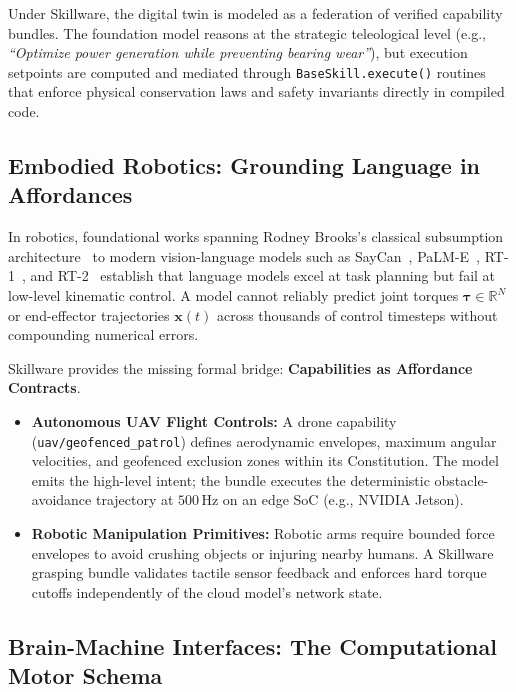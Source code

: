 Under Skillware, the digital twin is modeled as a federation of verified capability bundles. The foundation model reasons at the strategic teleological level (e.g., \emph{``Optimize power generation while preventing bearing wear''}), but execution setpoints are computed and mediated through \texttt{BaseSkill.execute()} routines that enforce physical conservation laws and safety invariants directly in compiled code.

\subsection{Embodied Robotics: Grounding Language in Affordances}
\label{subsec:embodied_robotics}

In robotics, foundational works spanning Rodney Brooks's classical subsumption architecture~\cite{brooks1986robust} to modern vision-language models such as SayCan~\cite{ahn2022can}, PaLM-E~\cite{driess2023palme}, RT-1~\cite{brohan2022rt1}, and RT-2~\cite{brohan2023rt2} establish that language models excel at task planning but fail at low-level kinematic control. A model cannot reliably predict joint torques $\boldsymbol{\tau} \in \mathbb{R}^N$ or end-effector trajectories $\mathbf{x}(t)$ across thousands of control timesteps without compounding numerical errors.

Skillware provides the missing formal bridge: \textbf{Capabilities as Affordance Contracts}.
\begin{itemize}[leftmargin=*]
  \item \textbf{Autonomous UAV Flight Controls:} A drone capability (\texttt{uav/geofenced\_patrol}) defines aerodynamic envelopes, maximum angular velocities, and geofenced exclusion zones within its Constitution. The model emits the high-level intent; the bundle executes the deterministic obstacle-avoidance trajectory at $500\,$Hz on an edge SoC (e.g., NVIDIA Jetson).
  \item \textbf{Robotic Manipulation Primitives:} Robotic arms require bounded force envelopes to avoid crushing objects or injuring nearby humans. A Skillware grasping bundle validates tactile sensor feedback and enforces hard torque cutoffs independently of the cloud model's network state.
\end{itemize}

\subsection{Brain-Machine Interfaces: The Computational Motor Schema}
\label{subsec:bmi_motor_schemas}


